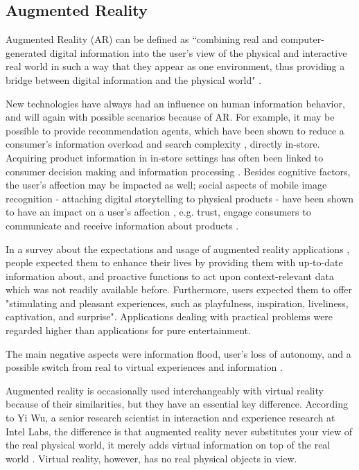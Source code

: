 \documentclass[12pt,journal,compsoc]{IEEEtran}
\begin{document}
\subsection{Augmented Reality}
Augmented Reality (AR) can be defined as “combining real and computer-generated digital information into the user’s view of the physical and interactive real world in such a way that they appear as one environment, thus providing a bridge between digital information and the physical world" \cite{Olsson2011b,Hoellerer2004,Klopfer2007,Vallino1998,Wellner1993}. 

New technologies have always had an influence on human information behavior, and will again with possible scenarios because of AR. For example, it may be possible to provide recommendation agents, which have been shown to reduce a consumer’s information overload and search complexity \cite{Kowatch2010}, directly in-store. Acquiring product information in in-store settings has often been linked to consumer decision making and information processing \cite{Karpischek2010,Kowatch2010,Xiao2007}. Besides cognitive factors, the user’s affection may be impacted as well; social aspects of mobile image recognition - attaching digital storytelling to physical products - have been shown to have an impact on a user’s affection \cite{Barthel2010}, e.g. trust, engage consumers to communicate and receive information about products \cite{Karpischek2010}.

In a survey about the expectations and usage of augmented reality applications \cite{Olsson2011b}, people expected them to enhance their lives by providing them with up-to-date information about, and proactive functions to act upon context-relevant data which was not readily available before. Furthermore, users expected them to offer "stimulating and pleasant experiences, such as playfulness, inspiration, liveliness, captivation, and surprise". Applications dealing with practical problems were regarded higher than applications for pure entertainment.

The main negative aspects were information flood, user's loss of autonomy, and a possible switch from real to virtual experiences and information \cite{Olsson2011b}.

Augmented reality is occasionally used interchangeably with virtual reality because of their similarities, but they have an essential key difference. According to Yi Wu, a senior research scientist in interaction and experience research at Intel Labs, the difference is that augmented reality never substitutes your view of the real physical world, it merely adds virtual information on top of the real world \cite{augmentedVirtualReality}. Virtual reality, however, has no real physical objects in view.
\end{document}
